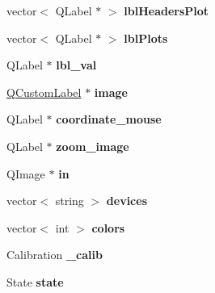 \begin{DoxyCompactItemize}
\item 
vector$<$ Q\+Label $\ast$ $>$ {\bfseries lbl\+Headers\+Plot}\hypertarget{classMainWindow_a1b39db4ffb71d848273a68ec5e9a9212}{}\label{classMainWindow_a1b39db4ffb71d848273a68ec5e9a9212}

\item 
vector$<$ Q\+Label $\ast$ $>$ {\bfseries lbl\+Plots}\hypertarget{classMainWindow_a69cc5316b71bc5aae325d3dac4db76aa}{}\label{classMainWindow_a69cc5316b71bc5aae325d3dac4db76aa}

\item 
Q\+Label $\ast$ {\bfseries lbl\+\_\+val}\hypertarget{classMainWindow_aabefa899f757a2f4557b6aeb8fe491da}{}\label{classMainWindow_aabefa899f757a2f4557b6aeb8fe491da}

\item 
\hyperlink{classQCustomLabel}{Q\+Custom\+Label} $\ast$ {\bfseries image}\hypertarget{classMainWindow_a2b4e7dadf9705d00ac5266a41e9bda4e}{}\label{classMainWindow_a2b4e7dadf9705d00ac5266a41e9bda4e}

\item 
Q\+Label $\ast$ {\bfseries coordinate\+\_\+mouse}\hypertarget{classMainWindow_af55218a3717b137c673d1a44dfbefa49}{}\label{classMainWindow_af55218a3717b137c673d1a44dfbefa49}

\item 
Q\+Label $\ast$ {\bfseries zoom\+\_\+image}\hypertarget{classMainWindow_a40bac1ed8e340d876c78a76139b0dd61}{}\label{classMainWindow_a40bac1ed8e340d876c78a76139b0dd61}

\item 
Q\+Image $\ast$ {\bfseries in}\hypertarget{classMainWindow_a747d09716ab770596ab6c7da4db422f5}{}\label{classMainWindow_a747d09716ab770596ab6c7da4db422f5}

\item 
vector$<$ string $>$ {\bfseries devices}\hypertarget{classMainWindow_a2b35cc9cc85f624c20c5f77f70f6cac5}{}\label{classMainWindow_a2b35cc9cc85f624c20c5f77f70f6cac5}

\item 
vector$<$ int $>$ {\bfseries colors}\hypertarget{classMainWindow_a50e022a7b906a07cd22deb48b3151740}{}\label{classMainWindow_a50e022a7b906a07cd22deb48b3151740}

\item 
Calibration {\bfseries \+\_\+calib}\hypertarget{classMainWindow_a759d318080fa015f809ba8ad68313788}{}\label{classMainWindow_a759d318080fa015f809ba8ad68313788}

\item 
State {\bfseries state}\hypertarget{classMainWindow_a5eee26949e66f69193d9858771c482fc}{}\label{classMainWindow_a5eee26949e66f69193d9858771c482fc}


\end{DoxyCompactItemize}
